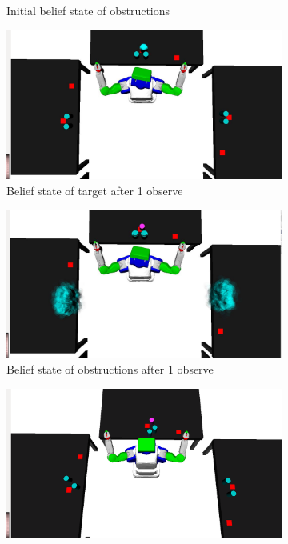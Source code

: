 \begin{figure}
\begin{subfigure}[b]{0.3\linewidth}
    \caption{Initial belief state of obstructions}
    \label{fig:step3}
  \end{subfigure}
  \begin{subfigure}[b]{0.3\linewidth}
    \includegraphics[width=\textwidth]{drawer_images/post_object.png}
    \caption{Belief state of target after 1 observe}
    \label{fig:step4}
  \end{subfigure}
  \begin{subfigure}[b]{0.3\linewidth}
    \includegraphics[width=\textwidth]{drawer_images/post_obstructions.png}
    \caption{Belief state of obstructions after 1 observe}
    \label{fig:step5}
  \end{subfigure}
  \begin{subfigure}[b]{0.3\linewidth}
    \includegraphics[width=\textwidth]{drawer_images/true_locs.png}

\end{subfigure}
\end{figure}
